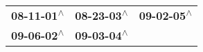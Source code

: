 \begin{supertabular}{lll}
 \textbf{08-11-01\textsuperscript{$\wedge$}} &  \textbf{08-23-03\textsuperscript{$\wedge$}} &  \textbf{09-02-05\textsuperscript{$\wedge$}} \\
 \textbf{09-06-02\textsuperscript{$\wedge$}} &  \textbf{09-03-04\textsuperscript{$\wedge$}} &                                              \\
\end{supertabular}
